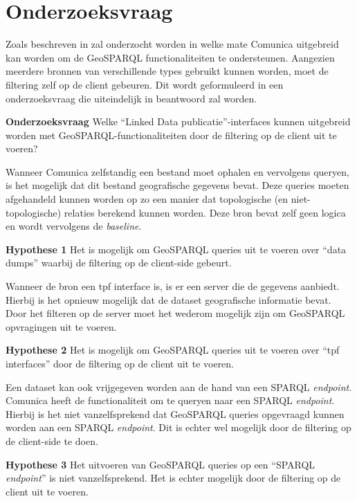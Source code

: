 \section{Onderzoeksvraag}
\label{sec:onderzoeksvraag}
Zoals beschreven in  zal onderzocht worden in welke mate Comunica uitgebreid kan worden om de GeoSPARQL functionaliteiten te ondersteunen. Aangezien meerdere bronnen van verschillende types gebruikt kunnen worden, moet de filtering zelf op de client gebeuren. Dit wordt geformuleerd in een onderzoeksvraag die uiteindelijk in  beantwoord zal worden. 

\textbf{Onderzoeksvraag} Welke ``Linked Data publicatie''-interfaces kunnen uitgebreid worden met GeoSPARQL-functionaliteiten door de filtering op de client uit te voeren?

Wanneer Comunica zelfstandig een bestand moet ophalen en vervolgens queryen, is het mogelijk dat dit bestand geografische gegevens bevat. Deze queries moeten afgehandeld kunnen worden op zo een manier dat topologische (en niet-topologische) relaties berekend kunnen worden. Deze bron bevat zelf geen logica en wordt vervolgens de \textit{baseline}.

\textbf{Hypothese 1} Het is mogelijk om GeoSPARQL queries uit te voeren over ``data dumps'' waarbij de filtering op de client-side gebeurt.

Wanneer de bron een \acrfull{tpf} interface is, is er een server die de gegevens aanbiedt. Hierbij is het opnieuw mogelijk dat de dataset geografische informatie bevat. Door het filteren op de server moet het wederom mogelijk zijn om GeoSPARQL opvragingen uit te voeren.

\textbf{Hypothese 2} Het is mogelijk om GeoSPARQL queries uit te voeren over ``\acrshort{tpf} interfaces'' door de filtering op de client uit te voeren.

Een dataset kan ook vrijgegeven worden aan de hand van een SPARQL \textit{endpoint}. Comunica heeft de functionaliteit om te queryen naar een SPARQL \textit{endpoint}. Hierbij is het niet vanzelfsprekend dat GeoSPARQL queries opgevraagd kunnen worden aan een SPARQL \textit{endpoint}. Dit is echter wel mogelijk door de filtering op de client-side te doen.

\textbf{Hypothese 3} Het uitvoeren van GeoSPARQL queries op een ``SPARQL \textit{endpoint}'' is niet vanzelfsprekend. Het is echter mogelijk door de filtering op de client uit te voeren.